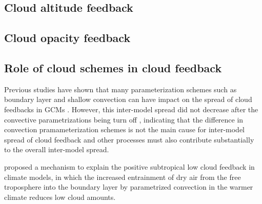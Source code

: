 \subsection{Cloud altitude feedback}

\subsection{Cloud opacity feedback}


\subsection{Role of cloud schemes in cloud feedback}


Previous studies have shown that many parameterization schemes such as boundary layer and shallow convection can have impact on the spread of cloud feedbacks in GCMs \cite[e.g.,][]{Gettelman2012,Zhang2013CGILS,Sherwood2014spread}.
However, this inter-model spread did not decrease after the convective parametrizations being turn off \citep{Webb2015}, indicating that the difference in convection pramameterization schemes is not the main cause for inter-model spread of cloud feedback and other processes must also contribute substantially to the overall inter-model spread.

\cite{Zhang2013CGILS} proposed a mechanism to explain the positive subtropical low cloud feedback in climate models, in which the increased entrainment of dry air from the free troposphere into the boundary layer by parametrized convection in the warmer climate reduces low cloud amounts.




